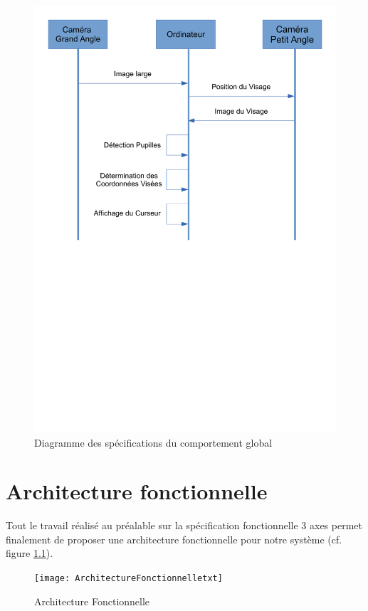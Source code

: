\begin{figure}[h]
  \centering
  \includegraphics[scale=0.6]{comportementGlobal}
  \caption{Diagramme des spécifications du comportement global}
  \label{fig:comportementGlobal}
\end{figure}

\chapter{Architecture fonctionnelle}

Tout le travail réalisé au préalable sur la spécification fonctionnelle 3 axes permet finalement de proposer une architecture fonctionnelle pour notre système (cf. figure \ref{fig:archiFonctionnelle}).
 
\begin{figure}[h]
  \centering
  \texttt{[image: ArchitectureFonctionnelletxt]}
  \caption{Architecture Fonctionnelle}
  \label{fig:archiFonctionnelle}
\end{figure}

